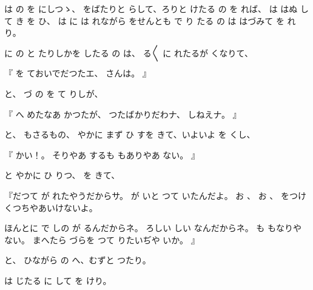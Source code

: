 は
の
を
にしつゝ、
をばたりと
らして、ろりと
けたる
の
を
れば、
は
はぬ
して
き
を
ひ、
は
に
は
れながら
をせんとも
で
り
たる
の
は
はづみて
を
れり。

に
の
と
たりしかを
したる
の
は、
る〳〵
に
れたるが
くなりて、

『
を
ておいでだつたエ、
さんは。
』

と、
づ
の
を
て
りしが、

『
へ
めたなあ
かつたが、
つたばかりだわナ、
しねえナ。
』

と、
もさるもの、
やかに
まず
ひ
すを
きて、いよいよ
を
くし、

『
かい！。
そりやあ
するも
もありやあ
ない。
』

と
やかに
ひ
りつ、
を
きて、

『だつて
が
れたやうだからサ。
が
いと
つて
いたんだよ。
お
、
お
、
をつけ
くつちやあいけないよ。

ほんとに
で
しの
が
るんだからネ。
ろしい
しい
なんだからネ。
も
もなりや
ない。
まへたら
づらを
つて
りたいぢや
いか。
』

と、
ひながら
の
へ、むずと
つたり。

は
じたる
に
して
を
けり。
